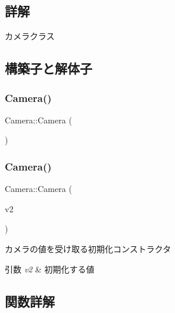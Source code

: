 \subsection{詳解}
カメラクラス 

\subsection{構築子と解体子}
\mbox{\label{class_camera_a01f94c3543f56ede7af49dc778f19331}} 
\subsubsection{\texorpdfstring{Camera()}{Camera()}\hspace{0.1cm}{\footnotesize\ttfamily [1/2]}}
{\footnotesize\ttfamily Camera\+::\+Camera (\begin{DoxyParamCaption}{ }\end{DoxyParamCaption})\hspace{0.3cm}{\ttfamily [inline]}}

\mbox{\label{class_camera_afe282ee51f1f39c041b0e7de9386cc6d}} 
\subsubsection{\texorpdfstring{Camera()}{Camera()}\hspace{0.1cm}{\footnotesize\ttfamily [2/2]}}
{\footnotesize\ttfamily Camera\+::\+Camera (\begin{DoxyParamCaption}\item[{const \mbox{\hyperlink{common_8h_afb0c5e21d4133ff4f200992c0b534e1b}{V\+E\+C2}} \&}]{v2 }\end{DoxyParamCaption})}



カメラの値を受け取る初期化コンストラクタ 


\begin{DoxyParams}{引数}
{\em v2} & 初期化する値 \\
\hline
\end{DoxyParams}


\subsection{関数詳解}
\mbox{\label{class_camera_ac3b4f1248489c0ac0faa521329de71cd}} 
